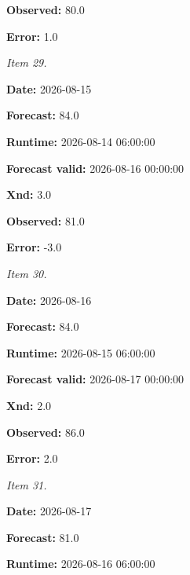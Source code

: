\documentclass[11pt]{article}
\begin{document}
\par\noindent\textbf{Observed:} 80.0

\par\noindent\textbf{Error:} 1.0

\par\noindent\textit{Item 29.}\par \par\noindent\textbf{Date:} 2026-08-15

\par\noindent\textbf{Forecast:} 84.0

\par\noindent\textbf{Runtime:} 2026-08-14 06:00:00

\par\noindent\textbf{Forecast valid:} 2026-08-16 00:00:00

\par\noindent\textbf{Xnd:} 3.0

\par\noindent\textbf{Observed:} 81.0

\par\noindent\textbf{Error:} -3.0

\par\noindent\textit{Item 30.}\par \par\noindent\textbf{Date:} 2026-08-16

\par\noindent\textbf{Forecast:} 84.0

\par\noindent\textbf{Runtime:} 2026-08-15 06:00:00

\par\noindent\textbf{Forecast valid:} 2026-08-17 00:00:00

\par\noindent\textbf{Xnd:} 2.0

\par\noindent\textbf{Observed:} 86.0

\par\noindent\textbf{Error:} 2.0

\par\noindent\textit{Item 31.}\par \par\noindent\textbf{Date:} 2026-08-17

\par\noindent\textbf{Forecast:} 81.0

\par\noindent\textbf{Runtime:} 2026-08-16 06:00:00
\end{document}

